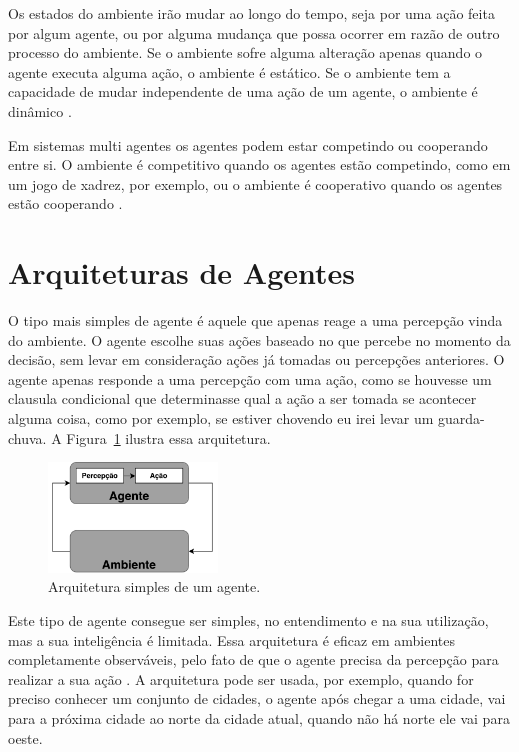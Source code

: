 Os estados do ambiente irão mudar ao longo do tempo, seja por uma ação feita por algum agente, ou por alguma mudança que possa ocorrer em razão de outro processo do ambiente. Se o ambiente sofre alguma alteração apenas quando o agente executa alguma ação, o ambiente é estático. Se o ambiente tem a capacidade de mudar independente de uma ação de um agente, o ambiente é dinâmico \cite{agent1999}.

Em sistemas multi agentes os agentes podem estar competindo ou cooperando entre si. O ambiente é competitivo quando os agentes estão competindo, como em um jogo de xadrez, por exemplo, ou o ambiente é cooperativo quando os agentes estão cooperando \cite{intelligence2003modern}.

\section{Arquiteturas de Agentes}


O tipo mais simples de agente é aquele que apenas reage a uma percepção vinda do ambiente. O agente escolhe suas ações baseado no que percebe no momento da decisão, sem levar em consideração ações já tomadas ou percepções anteriores. O agente apenas responde a uma percepção com uma ação, como se houvesse um clausula condicional que determinasse qual a ação a ser tomada se acontecer alguma coisa, como por exemplo, se estiver chovendo eu irei levar um guarda-chuva. A Figura~\ref{fig:agenteSimple} ilustra essa arquitetura. 

\begin{figure}[ht]
	\centering
	\includegraphics[width=0.4\textwidth]{fig/agentSimple.pdf}
	\caption{Arquitetura simples de um agente.}
	\label{fig:agenteSimple}
\end{figure} 


Este tipo de agente consegue ser simples, no entendimento e na sua utilização, mas a sua inteligência é limitada. Essa arquitetura é eficaz em ambientes completamente observáveis, pelo fato de que o agente precisa da percepção para realizar a sua ação \cite{intelligence2003modern}. A arquitetura pode ser usada, por exemplo, quando for preciso conhecer um conjunto de cidades, o agente após chegar a uma cidade, vai para a próxima cidade ao norte da cidade atual, quando não há norte ele vai para oeste. 

